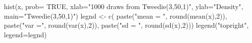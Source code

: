 \begin{Schunk}
\begin{Sinput}
  hist(x, prob= TRUE, xlab="1000 draws from Tweedie(3,50,1)", ylab="Density", main="Tweedie(3,50,1)")
  legnd <- c( paste("mean = ", round(mean(x),2)), paste("var =", round(var(x),2)), paste("sd = ", round(sd(x),2)))
  legend("topright", legend=legnd)
\end{Sinput}
\end{Schunk}

